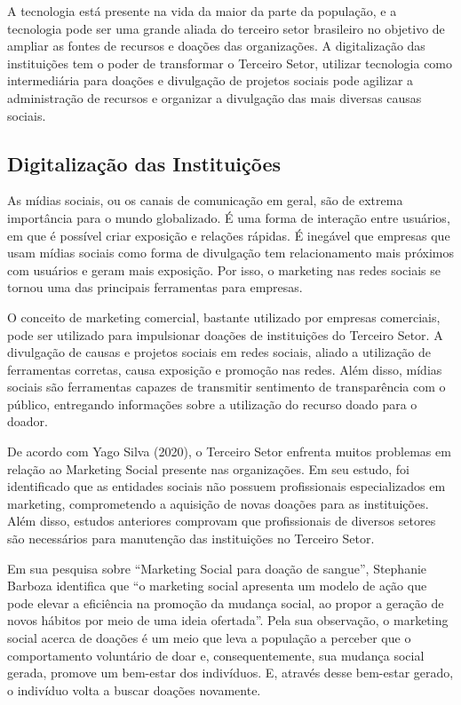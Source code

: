 \documentclass[conference]{IEEEtran}
\begin{document}
A tecnologia está presente na vida da maior da parte da população, e a tecnologia pode ser uma grande aliada do terceiro setor brasileiro no objetivo de ampliar as fontes de recursos e doações das organizações. A digitalização das instituições tem o poder de transformar o Terceiro Setor, utilizar tecnologia como intermediária para doações e divulgação de projetos sociais pode agilizar a administração de recursos e organizar a divulgação das mais diversas causas sociais.  


\subsection{Digitalização das Instituições}
As mídias sociais, ou os canais de comunicação em geral, são de extrema importância para o mundo globalizado. É uma forma de interação entre usuários, em que é possível criar exposição e relações rápidas. É inegável que empresas que usam mídias sociais como forma de divulgação tem relacionamento mais próximos com usuários e geram mais exposição. Por isso, o marketing nas redes sociais se tornou uma das principais ferramentas para empresas.

O conceito de marketing comercial, bastante utilizado por empresas comerciais, pode ser utilizado para impulsionar doações de instituições do Terceiro Setor. A divulgação de causas e projetos sociais em redes sociais, aliado a utilização de ferramentas corretas, causa exposição e promoção nas redes. Além disso, mídias sociais são ferramentas capazes de transmitir sentimento de transparência com o público, entregando informações sobre a utilização do recurso doado para o doador. 

De acordo com Yago Silva (2020), o Terceiro Setor enfrenta muitos problemas em relação ao Marketing Social presente nas organizações. Em seu estudo, foi identificado que as entidades sociais não possuem profissionais especializados em marketing, comprometendo a aquisição de novas doações para as instituições. Além disso, estudos anteriores comprovam que profissionais de diversos setores são necessários para manutenção das instituições no Terceiro Setor. \cite{silva2020dificuldades} 

Em sua pesquisa sobre “Marketing Social para doação de sangue”, Stephanie Barboza identifica que “o marketing social apresenta um modelo de ação que pode elevar a eficiência na promoção da mudança social, ao propor a geração de novos hábitos por meio de uma ideia ofertada”. Pela sua observação, o marketing social acerca de doações é um meio que leva a população a perceber que o comportamento voluntário de doar e, consequentemente, sua mudança social gerada, promove um bem-estar dos indivíduos. E, através desse bem-estar gerado, o indivíduo volta a buscar doações novamente. \cite{barboza2014marketing} \cite{cerosino2022impactos}
\end{document}
